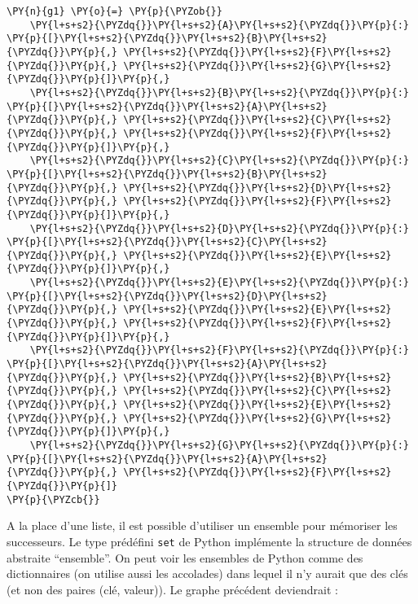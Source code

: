 \documentclass[12pt]{book}
\begin{document}
    \begin{tcolorbox}[breakable, size=fbox, boxrule=1pt, pad at break*=1mm,colback=cellbackground, colframe=cellborder]
\begin{Verbatim}[commandchars=\\\{\}]
\PY{n}{g1} \PY{o}{=} \PY{p}{\PYZob{}}
    \PY{l+s+s2}{\PYZdq{}}\PY{l+s+s2}{A}\PY{l+s+s2}{\PYZdq{}}\PY{p}{:} \PY{p}{[}\PY{l+s+s2}{\PYZdq{}}\PY{l+s+s2}{B}\PY{l+s+s2}{\PYZdq{}}\PY{p}{,} \PY{l+s+s2}{\PYZdq{}}\PY{l+s+s2}{F}\PY{l+s+s2}{\PYZdq{}}\PY{p}{,} \PY{l+s+s2}{\PYZdq{}}\PY{l+s+s2}{G}\PY{l+s+s2}{\PYZdq{}}\PY{p}{]}\PY{p}{,}
    \PY{l+s+s2}{\PYZdq{}}\PY{l+s+s2}{B}\PY{l+s+s2}{\PYZdq{}}\PY{p}{:} \PY{p}{[}\PY{l+s+s2}{\PYZdq{}}\PY{l+s+s2}{A}\PY{l+s+s2}{\PYZdq{}}\PY{p}{,} \PY{l+s+s2}{\PYZdq{}}\PY{l+s+s2}{C}\PY{l+s+s2}{\PYZdq{}}\PY{p}{,} \PY{l+s+s2}{\PYZdq{}}\PY{l+s+s2}{F}\PY{l+s+s2}{\PYZdq{}}\PY{p}{]}\PY{p}{,}
    \PY{l+s+s2}{\PYZdq{}}\PY{l+s+s2}{C}\PY{l+s+s2}{\PYZdq{}}\PY{p}{:} \PY{p}{[}\PY{l+s+s2}{\PYZdq{}}\PY{l+s+s2}{B}\PY{l+s+s2}{\PYZdq{}}\PY{p}{,} \PY{l+s+s2}{\PYZdq{}}\PY{l+s+s2}{D}\PY{l+s+s2}{\PYZdq{}}\PY{p}{,} \PY{l+s+s2}{\PYZdq{}}\PY{l+s+s2}{F}\PY{l+s+s2}{\PYZdq{}}\PY{p}{]}\PY{p}{,}
    \PY{l+s+s2}{\PYZdq{}}\PY{l+s+s2}{D}\PY{l+s+s2}{\PYZdq{}}\PY{p}{:} \PY{p}{[}\PY{l+s+s2}{\PYZdq{}}\PY{l+s+s2}{C}\PY{l+s+s2}{\PYZdq{}}\PY{p}{,} \PY{l+s+s2}{\PYZdq{}}\PY{l+s+s2}{E}\PY{l+s+s2}{\PYZdq{}}\PY{p}{]}\PY{p}{,}
    \PY{l+s+s2}{\PYZdq{}}\PY{l+s+s2}{E}\PY{l+s+s2}{\PYZdq{}}\PY{p}{:} \PY{p}{[}\PY{l+s+s2}{\PYZdq{}}\PY{l+s+s2}{D}\PY{l+s+s2}{\PYZdq{}}\PY{p}{,} \PY{l+s+s2}{\PYZdq{}}\PY{l+s+s2}{E}\PY{l+s+s2}{\PYZdq{}}\PY{p}{,} \PY{l+s+s2}{\PYZdq{}}\PY{l+s+s2}{F}\PY{l+s+s2}{\PYZdq{}}\PY{p}{]}\PY{p}{,}
    \PY{l+s+s2}{\PYZdq{}}\PY{l+s+s2}{F}\PY{l+s+s2}{\PYZdq{}}\PY{p}{:} \PY{p}{[}\PY{l+s+s2}{\PYZdq{}}\PY{l+s+s2}{A}\PY{l+s+s2}{\PYZdq{}}\PY{p}{,} \PY{l+s+s2}{\PYZdq{}}\PY{l+s+s2}{B}\PY{l+s+s2}{\PYZdq{}}\PY{p}{,} \PY{l+s+s2}{\PYZdq{}}\PY{l+s+s2}{C}\PY{l+s+s2}{\PYZdq{}}\PY{p}{,} \PY{l+s+s2}{\PYZdq{}}\PY{l+s+s2}{E}\PY{l+s+s2}{\PYZdq{}}\PY{p}{,} \PY{l+s+s2}{\PYZdq{}}\PY{l+s+s2}{G}\PY{l+s+s2}{\PYZdq{}}\PY{p}{]}\PY{p}{,}
    \PY{l+s+s2}{\PYZdq{}}\PY{l+s+s2}{G}\PY{l+s+s2}{\PYZdq{}}\PY{p}{:} \PY{p}{[}\PY{l+s+s2}{\PYZdq{}}\PY{l+s+s2}{A}\PY{l+s+s2}{\PYZdq{}}\PY{p}{,} \PY{l+s+s2}{\PYZdq{}}\PY{l+s+s2}{F}\PY{l+s+s2}{\PYZdq{}}\PY{p}{]}
\PY{p}{\PYZcb{}}
\end{Verbatim}
\end{tcolorbox}

    A la place d'une liste, il est possible d'utiliser un ensemble pour
mémoriser les successeurs. Le type prédéfini \texttt{set} de Python
implémente la structure de données abstraite ``ensemble''. On peut voir
les ensembles de Python comme des dictionnaires (on utilise aussi les
accolades) dans lequel il n'y aurait que des clés (et non des paires
(clé, valeur)). Le graphe précédent deviendrait :
\end{document}
